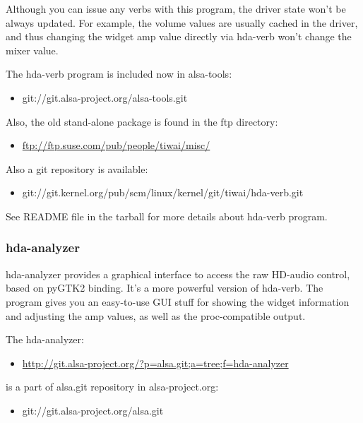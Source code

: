 \documentclass[a4paper,8pt,english]{sphinxmanual}
\begin{document}
Although you can issue any verbs with this program, the driver state
won't be always updated.  For example, the volume values are usually
cached in the driver, and thus changing the widget amp value directly
via hda-verb won't change the mixer value.

The hda-verb program is included now in alsa-tools:
\begin{itemize}
\item {} 
git://git.alsa-project.org/alsa-tools.git

\end{itemize}

Also, the old stand-alone package is found in the ftp directory:
\begin{itemize}
\item {} 
\href{ftp://ftp.suse.com/pub/people/tiwai/misc/}{ftp://ftp.suse.com/pub/people/tiwai/misc/}

\end{itemize}

Also a git repository is available:
\begin{itemize}
\item {} 
git://git.kernel.org/pub/scm/linux/kernel/git/tiwai/hda-verb.git

\end{itemize}

See README file in the tarball for more details about hda-verb
program.


\subsubsection{hda-analyzer}
\label{sound/hd-audio/notes:hda-analyzer}
hda-analyzer provides a graphical interface to access the raw HD-audio
control, based on pyGTK2 binding.  It's a more powerful version of
hda-verb.  The program gives you an easy-to-use GUI stuff for showing
the widget information and adjusting the amp values, as well as the
proc-compatible output.

The hda-analyzer:
\begin{itemize}
\item {} 
\href{http://git.alsa-project.org/?p=alsa.git;a=tree;f=hda-analyzer}{http://git.alsa-project.org/?p=alsa.git;a=tree;f=hda-analyzer}

\end{itemize}

is a part of alsa.git repository in alsa-project.org:
\begin{itemize}
\item {} 
git://git.alsa-project.org/alsa.git

\end{itemize}
\end{document}

